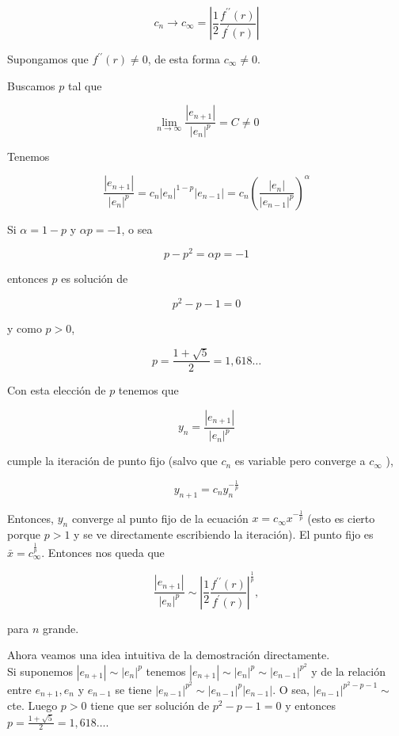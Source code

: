 \documentclass[10pt]{book}
\begin{document}
$$
c_{n} \rightarrow c_{\infty}=\left|\frac{1}{2} \frac{f^{\prime \prime}(r)}{f^{\prime}(r)}\right|
$$

Supongamos que $f^{\prime \prime}(r) \neq 0$, de esta forma $c_{\infty} \neq 0$.

Buscamos $p$ tal que

$$
\lim _{n \rightarrow \infty} \frac{\left|e_{n+1}\right|}{\left|e_{n}\right|^{p}}=C \neq 0
$$

Tenemos

$$
\frac{\left|e_{n+1}\right|}{\left|e_{n}\right|^{p}}=c_{n}\left|e_{n}\right|^{1-p}\left|e_{n-1}\right|=c_{n}\left(\frac{\left|e_{n}\right|}{\left|e_{n-1}\right|^{p}}\right)^{\alpha}
$$

Si $\alpha=1-p$ y $\alpha p=-1$, o sea

$$
p-p^{2}=\alpha p=-1
$$

entonces $p$ es solución de

$$
p^{2}-p-1=0
$$

y como $p>0$,

$$
p=\frac{1+\sqrt{5}}{2}=1,618 \ldots
$$

Con esta elección de $p$ tenemos que

$$
y_{n}=\frac{\left|e_{n+1}\right|}{\left|e_{n}\right|^{p}}
$$

cumple la iteración de punto fijo (salvo que $c_{n}$ es variable pero converge a $c_{\infty}$ ),

$$
y_{n+1}=c_{n} y_{n}^{-\frac{1}{p}}
$$

Entonces, $y_{n}$ converge al punto fijo de la ecuación $x=c_{\infty} x^{-\frac{1}{p}}$ (esto es cierto porque $p>1$ y se ve directamente escribiendo la iteración). El punto fijo es $\bar{x}=c_{\infty}^{\frac{1}{p}}$. Entonces nos queda que

$$
\frac{\left|e_{n+1}\right|}{\left|e_{n}\right|^{p}} \sim\left|\frac{1}{2} \frac{f^{\prime \prime}(r)}{f^{\prime}(r)}\right|^{\frac{1}{p}},
$$

para $n$ grande.

Ahora veamos una idea intuitiva de la demostración directamente.\\
Si suponemos $\left|e_{n+1}\right| \sim\left|e_{n}\right|^{p}$ tenemos $\left|e_{n+1}\right| \sim\left|e_{n}\right|^{p} \sim\left|e_{n-1}\right|^{p^{2}}$ y de la relación entre $e_{n+1}, e_{n}$ y $e_{n-1}$ se tiene $\left|e_{n-1}\right|^{p^{2}} \sim\left|e_{n-1}\right|^{p}\left|e_{n-1}\right|$. O sea, $\left|e_{n-1}\right|^{p^{2}-p-1} \sim$ cte. Luego $p>0$ tiene que ser solución de $p^{2}-p-1=0$ y entonces $p=\frac{1+\sqrt{5}}{2}=1,618 \ldots$.
\end{document}
